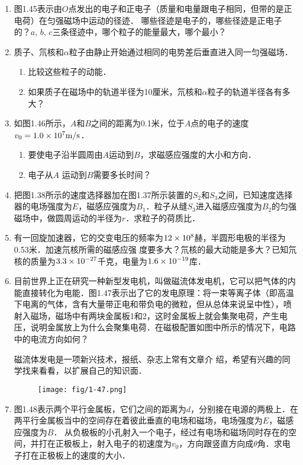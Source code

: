 \begin{enumerate}
\item 图1.45表示由$O$点发出的电子和正电子（质量和电量跟电子相同，但带的是正电荷）在匀强磁场中运动的径迹．
哪些径迹是电子的，哪些径迹是正电子的？$a$, $b$, $c$三条径迹中，哪个粒子的能量最大，哪个最小？
\item 质子、氘核和$\alpha$粒子由静止开始通过相同的电势差后垂直进入同一匀强磁场．
\begin{enumerate}
    \item 比较这些粒子的动能．
    \item 如果质子在磁场中的轨道半径为10厘米，氘核和$\alpha$粒子的轨道半径各有多大？
\end{enumerate}
\item 如图1.46所示，$A$和$B$之间的距离为0.1米，位于$A$点的电子的速度$v_0=1.0\times10^7\text{m}/\text{s}$．
\begin{enumerate}
    \item 要使电子沿半圆周由$A$运动到$B$，求磁感应强度的大小和方向．
    \item 电子从$A$
运动到$B$需要多长时间？
\end{enumerate}
\item 把图1.38所示的速度选择器加在图1.37所示装置的$S_2$和$S_3$之间，已知速度选择器的电场强度为$E$，磁感应强度为$B_1$．粒子从缝$S_3$进入磁感应强度为$B_2$的匀强磁场中，做圆周运动的半径为$r$．求粒子的荷质比．
\item  有一回旋加速器，它的交变电压的频率为$12\times10^8$赫，半圆形电极的半径为0.53米．加速氘核所需的磁感应强
度要多大？氘核的最大动能是多大？已知氘核的质量为$3.3\times10^{-27}$千克，电量为$1.6\times10^{-19}$库．
\item 目前世界上正在研究一种新型发电机，叫做磁流体发电机，它可以把气体的内能直接转化为电能．图1.47表示出了它的发电原理：将一束等离子体（即高温下电离的气体，含有大量带正电和带负电的微粒，但从总体来说呈中性），喷射入磁场，磁场中有两块金属板1和2，这时金属板上就会集聚电荷，产生电压，说明金属放上为什么会聚集电荷．在磁极配置如图中所示的情况下，电路中的电流方向如何？

磁流体发电是一项新兴技术，报纸、杂志上常有文章介
绍，希望有兴趣的同学找来看看，以扩展自己的知识面．

\begin{figure}[htp]\centering
	\texttt{[image: fig/1-47.png]}
	\caption{ }
\end{figure}

\item  图1.48表示两个平行金属板，它们之间的距离为$d$，分别接在电源的两极上．在两平行金属板当中的空间存在着彼此垂直的电场和磁场，电场强度为$E$，磁感应强度为$B$． 从负极板的小孔射入一个电子，经过有电场和磁场同时存在的空间，并打在正极板上，射入电子的初速度为$v_0$，方向跟竖直方向成$\theta$角．求电子打在正极板上的速度的大小．


\end{enumerate}
